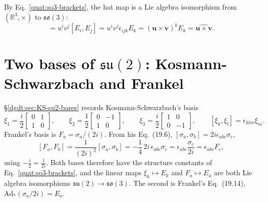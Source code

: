 By Eq.~\eqref{quat:so3-brackets}, the hat map is a Lie algebra
isomorphism from $(\mathbb R^3,\times)$ to $\mathfrak{so}(3)$:
\begin{equation}
 [\widehat{\mathbf u},\widehat{\mathbf v}]=u^iv^j[E_i,E_j]
 =u^iv^j\epsilon_{ijk}E_k=(\mathbf u\times\mathbf v)^kE_k
 =\widehat{\mathbf u\times\mathbf v}.
\end{equation}



\section{Two bases of \texorpdfstring{$\mathfrak{su}(2)$}{su(2)}: Kosmann-Schwarzbach and Frankel}
\S\ref{dgdt:sec:KS-su2-bases} records Kosmann-Schwarzbach's basis
\begin{equation}\label{quat:KS-xi}
 \xi_1=\frac i2\begin{bmatrix}0&1\\1&0\end{bmatrix},\qquad
 \xi_2=\frac12\begin{bmatrix}0&-1\\1&0\end{bmatrix},\qquad
 \xi_3=\frac i2\begin{bmatrix}1&0\\0&-1\end{bmatrix},\qquad
 [\xi_k,\xi_l]=\epsilon_{klm}\xi_m .
\end{equation}
Frankel's basis is $F_a=\sigma_a/(2i)$. From his Eq.~(19.6),
$[\sigma_a,\sigma_b]=2i\epsilon_{abc}\sigma_c$,
\begin{equation}\label{quat:Fa-brackets}
 [F_a,F_b]=\frac{1}{(2i)^2}[\sigma_a,\sigma_b]
 =-\frac14\,2i\,\epsilon_{abc}\sigma_c
 =\epsilon_{abc}\frac{\sigma_c}{2i}
 =\epsilon_{abc}F_c ,
\end{equation}
using $-\frac{i}{2}=\frac{1}{2i}$. Both bases therefore have the structure
constants of Eq.~\eqref{quat:so3-brackets}, and the linear maps
$\xi_k\mapsto E_k$ and $F_a\mapsto E_a$ are both Lie algebra isomorphisms
$\mathfrak{su}(2)\to\mathfrak{so}(3)$. The second is Frankel's
Eq.~(19.14), $\mathrm{Ad}_*(\sigma_a/2i)=E_a$.

